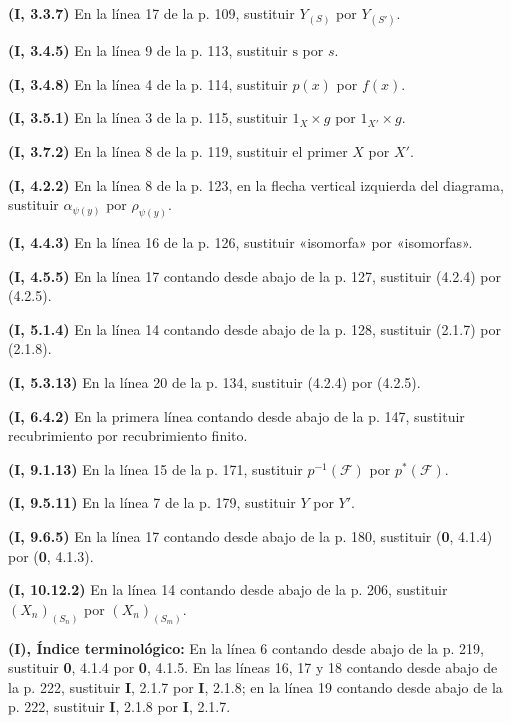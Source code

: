 \noindent\textbf{(I, 3.3.7)} En la línea 17 de la p. 109, sustituir
$Y_{(S)}$ por $Y_{(S')}$.

\noindent\textbf{(I, 3.4.5)} En la línea 9 de la p. 113, sustituir
$\mathrm s$ por $s$.

\noindent\textbf{(I, 3.4.8)} En la línea 4 de la p. 114, sustituir $p(x)$ por
$f(x)$.

\noindent\textbf{(I, 3.5.1)} En la línea 3 de la p. 115, sustituir
$1_X\times g$ por $1_{X'}\times g$.

\noindent\textbf{(I, 3.7.2)} En la línea 8 de la p. 119, sustituir el primer
$X$ por $X'$.

\noindent\textbf{(I, 4.2.2)} En la línea 8 de la p. 123, en la flecha vertical
izquierda del diagrama, sustituir $\alpha_{\psi(y)}$ por $\rho_{\psi(y)}$.

\noindent\textbf{(I, 4.4.3)} En la línea 16 de la p. 126, sustituir «isomorfa»
por «isomorfas».

\noindent\textbf{(I, 4.5.5)} En la línea 17 contando desde abajo de la p. 127,
sustituir (4.2.4) por (4.2.5).

\noindent\textbf{(I, 5.1.4)} En la línea 14 contando desde abajo de la p. 128,
sustituir (2.1.7) por (2.1.8).

\noindent\textbf{(I, 5.3.13)} En la línea 20 de la p. 134, sustituir (4.2.4)
por (4.2.5).

\noindent\textbf{(I, 6.4.2)} En la primera línea contando desde abajo de la
p. 147, sustituir recubrimiento por recubrimiento finito.

\noindent\textbf{(I, 9.1.13)} En la línea 15 de la p. 171, sustituir
$p^{-1}(\mathscr F)$ por $p^*(\mathscr F)$.

\noindent\textbf{(I, 9.5.11)} En la línea 7 de la p. 179, sustituir $Y$ por
$Y'$.

\noindent\textbf{(I, 9.6.5)} En la línea 17 contando desde abajo de la p. 180,
sustituir (\textbf{0}, 4.1.4) por (\textbf{0}, 4.1.3).

\noindent\textbf{(I, 10.12.2)} En la línea 14 contando desde abajo de la p.
206, sustituir $(X_n)_{(S_n)}$ por $(X_n)_{(S_m)}$.

\clearpage
{}
\noindent\textbf{(I), Índice terminológico:} En la línea 6 contando desde
abajo de la p. 219, sustituir \textbf{0}, 4.1.4 por \textbf{0}, 4.1.5. En las líneas 16, 17 y 18
contando desde abajo de la p. 222, sustituir \textbf{I}, 2.1.7 por \textbf{I}, 2.1.8; en la línea
19 contando desde abajo de la p. 222, sustituir \textbf{I}, 2.1.8 por \textbf{I}, 2.1.7.

